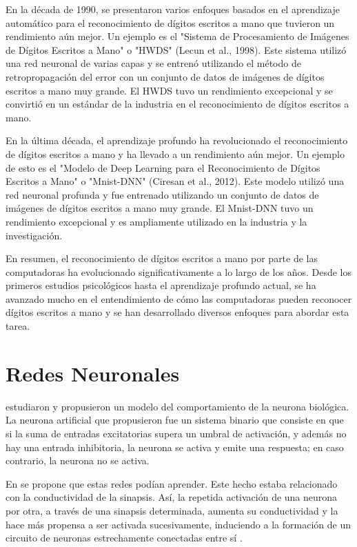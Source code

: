 En la década de 1990, se presentaron varios enfoques basados en el aprendizaje automático para el reconocimiento de
dígitos escritos a mano que tuvieron un rendimiento aún mejor. Un ejemplo es el "Sistema de Procesamiento de Imágenes
de Dígitos Escritos a Mano" o "HWDS" (Lecun et al., 1998). Este sistema utilizó una red neuronal de varias capas y se
entrenó utilizando el método de retropropagación del error con un conjunto de datos de imágenes de dígitos escritos a
mano muy grande. El HWDS tuvo un rendimiento excepcional y se convirtió en un estándar de la industria en el
reconocimiento de dígitos escritos a mano.

En la última década, el aprendizaje profundo ha revolucionado el reconocimiento de dígitos escritos a mano y ha llevado
a un rendimiento aún mejor. Un ejemplo de esto es el "Modelo de Deep Learning para el Reconocimiento de Dígitos
Escritos a Mano" o "Mnist-DNN" (Ciresan et al., 2012). Este modelo utilizó una red neuronal profunda y fue entrenado
utilizando un conjunto de datos de imágenes de dígitos escritos a mano muy grande. El Mnist-DNN tuvo un rendimiento
excepcional y es ampliamente utilizado en la industria y la investigación.

En resumen, el reconocimiento de dígitos escritos a mano por parte de las computadoras ha evolucionado
significativamente a lo largo de los años. Desde los primeros estudios psicológicos hasta el aprendizaje profundo
actual, se ha avanzado mucho en el entendimiento de cómo las computadoras pueden reconocer dígitos escritos a mano y se
han desarrollado diversos enfoques para abordar esta tarea.

\section{Redes Neuronales}
\cite{mcculloch1943logical} estudiaron y propusieron un modelo del comportamiento de la
neurona biológica. La neurona artificial que propusieron fue un sistema binario que consiste en que si la suma de entradas excitatorias supera un umbral de activación, y además no
hay una entrada inhibitoria, la neurona se activa y emite una respuesta; en caso contrario, la neurona no se activa.

En \citeyear{hebb1949organization} se propone que estas redes podían aprender. Este hecho estaba relacionado con la
conductividad de la sinapsis. Así, la repetida activación de una neurona por otra, a través de una sinapsis
determinada, aumenta su conductividad y la hace más propensa a ser activada sucesivamente, induciendo a la formación de
un circuito de neuronas estrechamente conectadas entre sí \parencite{hebb1949organization}.

